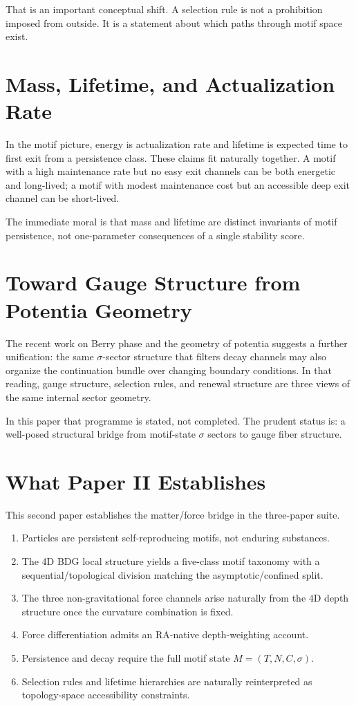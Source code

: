 \documentclass[11pt]{article}
\begin{document}
That is an important conceptual shift. A selection rule is not a prohibition imposed from outside. It is a statement about which paths through motif space exist.

\section{Mass, Lifetime, and Actualization Rate}
In the motif picture, energy is actualization rate and lifetime is expected time to first exit from a persistence class. These claims fit naturally together. A motif with a high maintenance rate but no easy exit channels can be both energetic and long-lived; a motif with modest maintenance cost but an accessible deep exit channel can be short-lived.

The immediate moral is that mass and lifetime are distinct invariants of motif persistence, not one-parameter consequences of a single stability score.

\section{Toward Gauge Structure from Potentia Geometry}
The recent work on Berry phase and the geometry of potentia suggests a further unification: the same $\sigma$-sector structure that filters decay channels may also organize the continuation bundle over changing boundary conditions. In that reading, gauge structure, selection rules, and renewal structure are three views of the same internal sector geometry.

In this paper that programme is stated, not completed. The prudent status is: a well-posed structural bridge from motif-state $\sigma$ sectors to gauge fiber structure.

\section{What Paper II Establishes}
This second paper establishes the matter/force bridge in the three-paper suite.
\begin{enumerate}[label=\arabic*.]
    \item Particles are persistent self-reproducing motifs, not enduring substances.
    \item The 4D BDG local structure yields a five-class motif taxonomy with a sequential/topological division matching the asymptotic/confined split.
    \item The three non-gravitational force channels arise naturally from the 4D depth structure once the curvature combination is fixed.
    \item Force differentiation admits an RA-native depth-weighting account.
    \item Persistence and decay require the full motif state $M=(T,N,C,\sigma)$.
    \item Selection rules and lifetime hierarchies are naturally reinterpreted as topology-space accessibility constraints.
\end{enumerate}
\end{document}
